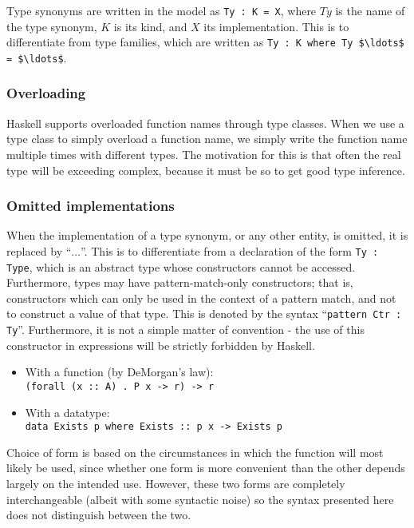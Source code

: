 Type synonyms are written in the model as \lstinline!Ty : K = X!, where $Ty$ is 
the name
of the type synonym, $K$ is its kind, and $X$ its implementation. This is to 
differentiate
from type families, which are written as 
\lstinline!Ty : K where Ty $\ldots$ = $\ldots$!.

\subsubsection*{Overloading}

Haskell supports overloaded function names through type classes. When we use a 
type 
class to simply overload a function name, we simply write the function name
multiple times with different types. The motivation for this is that often the 
real type will be exceeding complex, because it must be so to get good type 
inference. 



\subsubsection*{Omitted implementations}

When the implementation of a type synonym, or any other entity, is omitted, it
is replaced by ``$\ldots$''. This is to differentiate from a declaration of the 
form
\lstinline!Ty : Type!, which is an abstract type whose constructors cannot be
accessed. Furthermore, types may have pattern-match-only constructors; that is,
constructors which can only be used in the context of a pattern match, and not
to construct a value of that type. This is denoted by the syntax
``\lstinline!pattern Ctr : Ty!''. Furthermore, it is not a simple matter of
convention - the use of this constructor in expressions will be strictly
forbidden by Haskell.


\begin{itemize}
\item With a function (by DeMorgan's law): \\ \texttt{(forall (x :: A) . P 
x -> r) -> r}
\item With a datatype: \\ \texttt{data Exists p where Exists :: p x -> 
Exists p}
\end{itemize} 

Choice of form is based on the circumstances in which the function
will most likely be used, since whether one form is more convenient than the
other depends largely on the intended use. However, these two forms are
completely interchangeable (albeit with some syntactic noise) so the syntax
presented here does not distinguish between the two. 


